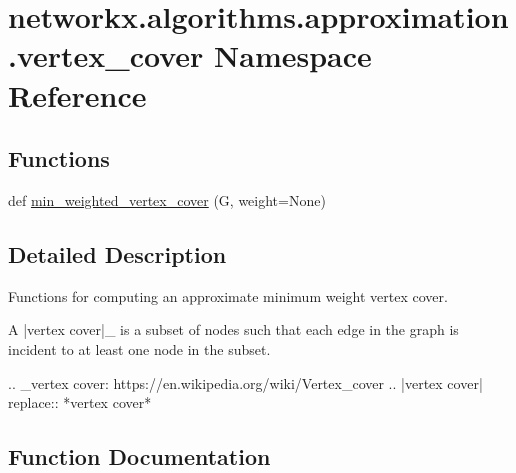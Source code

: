 \hypertarget{namespacenetworkx_1_1algorithms_1_1approximation_1_1vertex__cover}{}\section{networkx.\+algorithms.\+approximation.\+vertex\+\_\+cover Namespace Reference}
\label{namespacenetworkx_1_1algorithms_1_1approximation_1_1vertex__cover}
\subsection*{Functions}
\begin{DoxyCompactItemize}
\item 
def \hyperlink{namespacenetworkx_1_1algorithms_1_1approximation_1_1vertex__cover_ace839ac2e5a7441e978ce79a96dbb167}{min\+\_\+weighted\+\_\+vertex\+\_\+cover} (G, weight=None)
\end{DoxyCompactItemize}


\subsection{Detailed Description}
\begin{DoxyVerb}Functions for computing an approximate minimum weight vertex cover.

A |vertex cover|_ is a subset of nodes such that each edge in the graph
is incident to at least one node in the subset.

.. _vertex cover: https://en.wikipedia.org/wiki/Vertex_cover
.. |vertex cover| replace:: *vertex cover*\end{DoxyVerb}
 

\subsection{Function Documentation}
\mbox{\label{namespacenetworkx_1_1algorithms_1_1approximation_1_1vertex__cover_ace839ac2e5a7441e978ce79a96dbb167}} 
